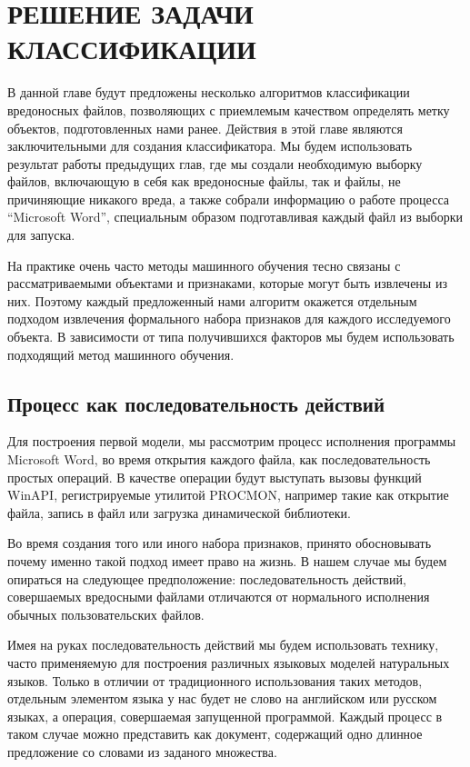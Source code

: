 \chapter{РЕШЕНИЕ ЗАДАЧИ КЛАССИФИКАЦИИ}

В данной главе будут предложены несколько алгоритмов классификации вредоносных файлов, позволяющих с приемлемым качеством определять метку объектов, подготовленных нами ранее.
Действия в этой главе являются заключительными для создания классификатора. Мы будем использовать результат работы предыдущих глав, где мы создали необходимую выборку файлов, включающую в себя как вредоносные файлы, так и файлы, не причиняющие никакого вреда, а также собрали информацию о работе процесса “Microsoft Word”, специальным образом подготавливая каждый файл из выборки для запуска.

На практике очень часто методы машинного обучения тесно связаны с рассматриваемыми объектами и признаками, которые могут быть извлечены из них. Поэтому каждый предложенный нами алгоритм окажется отдельным подходом извлечения формального набора признаков для каждого исследуемого объекта. В зависимости от типа получившихся факторов мы будем использовать подходящий метод машинного обучения.

\section{Процесс как последовательность действий}

Для построения первой модели, мы рассмотрим процесс исполнения программы Microsoft Word, во время открытия каждого файла, как последовательность простых операций. В качестве операции будут выступать вызовы функций WinAPI, регистрируемые утилитой PROCMON, например такие как открытие файла, запись в файл или загрузка динамической библиотеки.

Во время создания того или иного набора признаков, принято обосновывать почему именно такой подход имеет право на жизнь. В нашем случае мы будем опираться на следующее предположение: последовательность действий, совершаемых вредосными файлами отличаются от нормального исполнения обычных пользовательских файлов. 

Имея на руках последовательность действий мы будем использовать технику, часто применяемую для построения различных языковых моделей натуральных языков. Только в отличии от традиционного использования таких методов, отдельным элементом языка у нас будет не слово на английском или русском языках, а операция, совершаемая запущенной программой. Каждый процесс в таком случае можно представить как документ, содержащий одно длинное предложение со словами из заданого множества.


